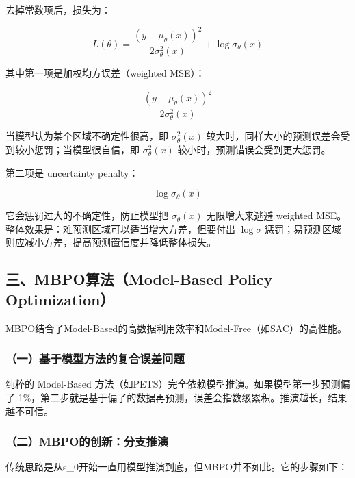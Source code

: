 去掉常数项后，损失为：

\[
L(\theta)=\frac{(y-\mu_\theta(x))^2}{2\sigma_\theta^2(x)}+\log\sigma_\theta(x)
\]

其中第一项是加权均方误差（weighted MSE）：

\[
\frac{(y-\mu_\theta(x))^2}{2\sigma_\theta^2(x)}
\]

当模型认为某个区域不确定性很高，即 \(\sigma_\theta^2(x)\) 较大时，同样大小的预测误差会受到较小惩罚；当模型很自信，即 \(\sigma_\theta^2(x)\) 较小时，预测错误会受到更大惩罚。

第二项是 uncertainty penalty：

\[
\log\sigma_\theta(x)
\]

它会惩罚过大的不确定性，防止模型把 \(\sigma_\theta(x)\) 无限增大来逃避 weighted MSE。整体效果是：难预测区域可以适当增大方差，但要付出 \(\log\sigma\) 惩罚；易预测区域则应减小方差，提高预测置信度并降低整体损失。

\hypertarget{ux4e09mbpoux7b97ux6cd5model-based-policy-optimization}{%
\subsection{三、MBPO算法（Model-Based Policy Optimization）}\label{ux4e09mbpoux7b97ux6cd5model-based-policy-optimization}}

MBPO结合了Model-Based的高数据利用效率和Model-Free（如SAC）的高性能。

\hypertarget{ux4e00ux57faux4e8eux6a21ux578bux65b9ux6cd5ux7684ux590dux5408ux8befux5deeux95eeux9898}{%
\subsubsection{（一）基于模型方法的复合误差问题}\label{ux4e00ux57faux4e8eux6a21ux578bux65b9ux6cd5ux7684ux590dux5408ux8befux5deeux95eeux9898}}

纯粹的 Model-Based 方法（如PETS）完全依赖模型推演。如果模型第一步预测偏了 1\%，第二步就是基于偏了的数据再预测，误差会指数级累积。推演越长，结果越不可信。

\hypertarget{ux4e8cmbpoux7684ux521bux65b0ux5206ux652fux63a8ux6f14}{%
\subsubsection{（二）MBPO的创新：分支推演}\label{ux4e8cmbpoux7684ux521bux65b0ux5206ux652fux63a8ux6f14}}

传统思路是从s\_0开始一直用模型推演到底，但MBPO并不如此。它的步骤如下：

